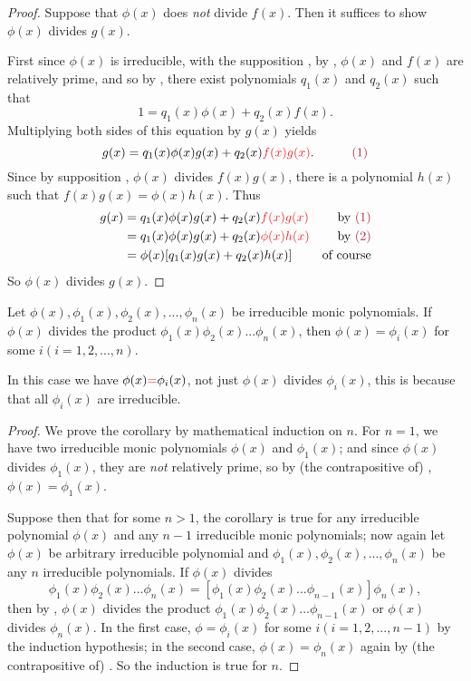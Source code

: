 \begin{proof}
Suppose that \(\phi(x)\) does \emph{not} divide \(f(x)\).  \quad
Then it suffices to show \(\phi(x)\) divides \(g(x)\).

First since \(\phi(x)\) is irreducible, with the supposition , by , \(\phi(x)\) and \(f(x)\) are relatively prime, and so by , there exist polynomials \(q_1(x)\) and \(q_2(x)\) such that
\[
    1 = q_1(x)\phi(x) + q_2(x)f(x).
\]
Multiplying both sides of this equation by \(g(x)\) yields
\[
    g(x) = q_1(x)\phi(x)g(x) + q_2(x) \RED{f(x)g(x)}. \quad \quad \quad \MAROON{(1)}
\]
Since by supposition , \(\phi(x)\) divides \(f(x)g(x)\), there is a polynomial \(h(x)\) such that \(f(x)g(x) = \phi(x)h(x)\).  \quad
Thus
\begin{align*}
    g(x) & = q_1(x)\phi(x)g(x) + q_2(x) \RED{f(x)g(x)} & \text{by \MAROON{(1)}} \\
         & = q_1(x)\phi(x)g(x) + q_2(x) \RED{\phi(x)h(x)} & \text{by \MAROON{(2)}} \\
         & = \phi(x) [q_1(x)g(x) + q_2(x)h(x)] & \text{of course}
\end{align*}
So \(\phi(x)\) divides \(g(x)\).
\end{proof}

\begin{appendix corollary} \label{corollary e.8.1}
Let \(\phi(x), \phi_1(x), \phi_2(x), ..., \phi_n(x)\) be irreducible monic polynomials.
If \(\phi(x)\) divides the product \(\phi_1(x)\phi_2(x) ... \phi_n(x)\), then \(\phi(x) = \phi_i(x)\) for some \(i (i = 1, 2, ..., n)\).
\end{appendix corollary}

\begin{note}
In this case we have \(\phi(x) \RED{=} \phi_i(x)\), not just \(\phi(x)\) divides \(\phi_i(x)\), this is because that all \(\phi_i(x)\) are irreducible.
\end{note}

\begin{proof}
We prove the corollary by mathematical induction on \(n\).
For \(n = 1\), we have two irreducible monic polynomials \(\phi(x)\) and \(\phi_1(x)\);
and since \(\phi(x)\) divides \(\phi_1(x)\), they are \emph{not} relatively prime, so by (the contrapositive of) , \(\phi(x) = \phi_1(x)\).

Suppose then that for some \(n > 1\), the corollary is true for any irreducible polynomial \(\phi(x)\) and any \(n - 1\) irreducible monic polynomials; now again let \(\phi(x)\) be arbitrary irreducible polynomial and \(\phi_1(x), \phi_2(x), ..., \phi_n(x)\) be any \(n\) irreducible polynomials.
If \(\phi(x)\) divides
\[
    \phi_1(x)\phi_2(x)...\phi_n(x) = [\phi_1(x)\phi_2(x)...\phi_{n-1}(x)]\phi_n(x),
\]
then by , \(\phi(x)\) divides the product \(\phi_1(x)\phi_2(x) ... \phi_{n - 1}(x)\) or \(\phi(x)\) divides \(\phi_n(x)\).
In the first case, \(\phi = \phi_i(x)\) for some \(i (i = 1, 2, ..., n - 1)\) by the induction hypothesis;
in the second case, \(\phi(x) = \phi_n(x)\) again by (the contrapositive of) .
So the induction is true for \(n\).
\end{proof}

